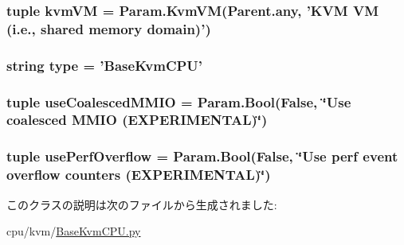 \label{classBaseKvmCPU_1_1BaseKvmCPU_a0056ec65331f3739ec47a849738aeebe}
\hypertarget{classBaseKvmCPU_1_1BaseKvmCPU_a46b4643d842fbe4d40dd7450654121e5}{
\subsubsection[{kvmVM}]{\setlength{\rightskip}{0pt plus 5cm}tuple {\bf kvmVM} = Param.KvmVM(Parent.any, 'KVM VM (i.e., shared memory domain)')}}
\label{classBaseKvmCPU_1_1BaseKvmCPU_a46b4643d842fbe4d40dd7450654121e5}
\hypertarget{classBaseKvmCPU_1_1BaseKvmCPU_acce15679d830831b0bbe8ebc2a60b2ca}{
\subsubsection[{type}]{\setlength{\rightskip}{0pt plus 5cm}string {\bf type} = '{\bf BaseKvmCPU}'}}
\label{classBaseKvmCPU_1_1BaseKvmCPU_acce15679d830831b0bbe8ebc2a60b2ca}
\hypertarget{classBaseKvmCPU_1_1BaseKvmCPU_a2196241e0709eb29276d6d7f0ea1a8d4}{
\subsubsection[{useCoalescedMMIO}]{\setlength{\rightskip}{0pt plus 5cm}tuple {\bf useCoalescedMMIO} = Param.Bool(False, \char`\"{}Use coalesced MMIO (EXPERIMENTAL)\char`\"{})}}
\label{classBaseKvmCPU_1_1BaseKvmCPU_a2196241e0709eb29276d6d7f0ea1a8d4}
\hypertarget{classBaseKvmCPU_1_1BaseKvmCPU_ad8233e9873fcc4d5483e71effbceaf2e}{
\subsubsection[{usePerfOverflow}]{\setlength{\rightskip}{0pt plus 5cm}tuple {\bf usePerfOverflow} = Param.Bool(False, \char`\"{}Use perf event overflow counters (EXPERIMENTAL)\char`\"{})}}
\label{classBaseKvmCPU_1_1BaseKvmCPU_ad8233e9873fcc4d5483e71effbceaf2e}


このクラスの説明は次のファイルから生成されました:\begin{DoxyCompactItemize}
\item 
cpu/kvm/\hyperlink{BaseKvmCPU_8py}{BaseKvmCPU.py}\end{DoxyCompactItemize}
